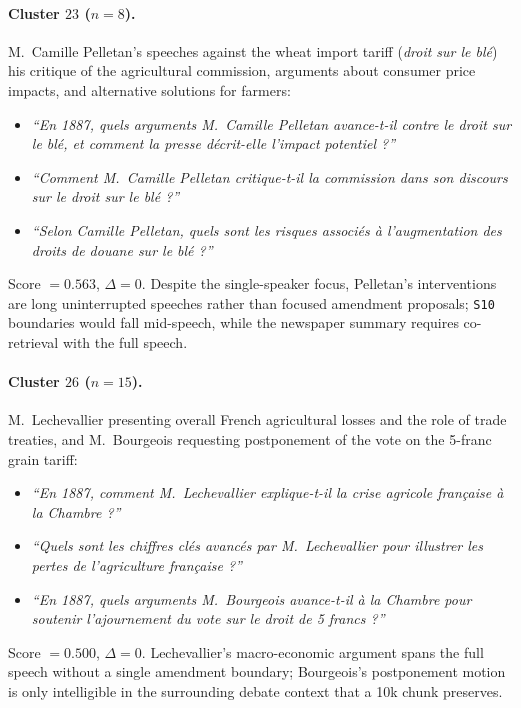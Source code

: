 \paragraph{Cluster $23$ ($n=8$).}
M.~Camille Pelletan's speeches against the wheat import tariff (\emph{droit sur
le bl\'{e}}) his critique of the agricultural commission, arguments about
consumer price impacts, and alternative solutions for farmers:
\begin{itemize}
  \item \textit{``En 1887, quels arguments M.~Camille Pelletan avance-t-il contre
    le droit sur le bl\'{e}, et comment la presse d\'{e}crit-elle l'impact
    potentiel ?''}
  \item \textit{``Comment M.~Camille Pelletan critique-t-il la commission dans son
    discours sur le droit sur le bl\'{e} ?''}
  \item \textit{``Selon Camille Pelletan, quels sont les risques associ\'{e}s
    \`{a} l'augmentation des droits de douane sur le bl\'{e} ?''}
\end{itemize}
Score $= 0.563$, $\Delta = 0$.
Despite the single-speaker focus, Pelletan's interventions are long uninterrupted
speeches rather than focused amendment proposals; \texttt{S10} boundaries would
fall mid-speech, while the newspaper summary requires co-retrieval with the full
speech.

\paragraph{Cluster $26$ ($n=15$).}
M.~Lechevallier presenting overall French agricultural losses and the role of
trade treaties, and M.~Bourgeois requesting postponement of the vote on the
5-franc grain tariff:
\begin{itemize}
  \item \textit{``En 1887, comment M.~Lechevallier explique-t-il la crise agricole
    fran\c{c}aise \`{a} la Chambre ?''}
  \item \textit{``Quels sont les chiffres cl\'{e}s avanc\'{e}s par
    M.~Lechevallier pour illustrer les pertes de l'agriculture fran\c{c}aise ?''}
  \item \textit{``En 1887, quels arguments M.~Bourgeois avance-t-il \`{a} la
    Chambre pour soutenir l'ajournement du vote sur le droit de 5 francs ?''}
\end{itemize}
Score $= 0.500$, $\Delta = 0$.
Lechevallier's macro-economic argument spans the full speech without a single
amendment boundary; Bourgeois's postponement motion is only intelligible in the
surrounding debate context that a 10k chunk preserves.

